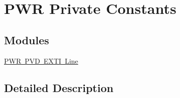 \hypertarget{group___p_w_r___private___constants}{}\section{P\+WR Private Constants}
\label{group___p_w_r___private___constants}
\subsection*{Modules}
\begin{DoxyCompactItemize}
\item 
\mbox{\hyperlink{group___p_w_r___p_v_d___e_x_t_i___line}{P\+W\+R P\+V\+D E\+X\+T\+I Line}}
\end{DoxyCompactItemize}


\subsection{Detailed Description}
